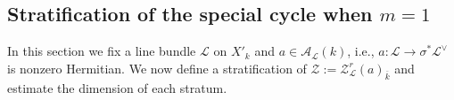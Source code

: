 \documentclass[reqno]{amsart}
\numberwithin{equation}{section}
\DeclareMathOperator{\Frob}{Fr}
\DeclareMathOperator{\Id}{Id}
\DeclareMathOperator{\Sht}{Sht}
\DeclareMathOperator{\Hk}{Hk}
\newcommand{\ov}{\overline}
\renewcommand\c{\circ}
\renewcommand\d\delta
\newcommand\D\Delta
\newcommand{\s}{\sigma}
\newcommand\cA{\mathcal{A}}
\newcommand\cE{\mathcal{E}}
\newcommand\cF{\mathcal{F}}
\newcommand\cL{\mathcal{L}}
\newcommand\cM{\mathcal{M}}
\newcommand\cZ{\mathcal{Z}}
\newcommand\frD{\mathfrak{D}}
\newcommand\frH{\mathfrak{H}}
\newcommand\frM{\mathfrak{M}}
\newcommand\frS{\mathfrak{S}}
\newtheorem{lemma}[thm]{Lemma}
\theoremstyle{remark}
\numberwithin{equation}{section}
\begin{document}
%
%
%


\subsection{Stratification of the special cycle when $m=1$}\label{ss:strat KR div}
In this section we fix a line bundle $\cL$ on $X'_{k}$ and $a\in \cA_{\cL}(k)$, i.e.,  $a: \cL\to \s^{*}\cL^{\vee}$ is nonzero Hermitian. We now define a stratification of $\cZ:=\cZ_{\cL}^{r}(a)_{\ov k}$ and estimate the dimension of each stratum.
\end{document}
